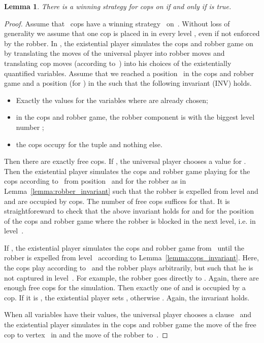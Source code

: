 \documentclass[authoryear]{article}
\makeatletter
\newtheorem{lemma}[theorem]{Lemma}
\theoremstyle{definition}
\newcommand{\0}{\emptyset}
\newcommand{\ie}{i.e.\@\xspace}
\makeatother
\begin{document}
\begin{lemma}
  There is a winning strategy for  cops on  if and only if
   is true.
\end{lemma}
\begin{proof}
  Assume that~ cops have a winning strategy~ on~. Without
  loss of generality we assume that one cop is placed in  in every
  level , even if not enforced by the robber. In , the
  existential player simulates the cops and robber game on  by
  translating the moves of the universal player into robber moves and
  translating cop moves (according to~) into his choices of the
  existentially quantified variables. Assume that we reached a position~ in
  the cops and robber game and a position  (for ) in the
   such that the following invariant (INV) holds.
\begin{itemize}
 \item Exactly the values  for the variables  where 
 are already chosen;

\item in the cops and robber game, the robber component is  with
  the biggest level number ;

\item the cops occupy  for the tuple  and nothing else. 
\end{itemize}
Then there are exactly  free cops. If , the
universal player chooses a value  for . Then
the existential player simulates the cops and robber game playing for
the cops according to~ from position~ and for the robber as in
Lemma~\ref{lemma:robber_invariant} such that the robber is expelled
from level  and  and  are occupied by cops. The number of
free cops suffices for that. It is straightforeward to check that the
above invariant holds for  and for the position of the cops and
robber game where the robber is blocked in the next level, \ie in level~.

If , the existential player simulates the cops and robber 
game from~ until the robber is expelled from level~ according to 
Lemma~\ref{lemma:cops_invariant}. Here, the cops play according
to~ and the robber plays arbitrarily, but such that he is not
captured in level~. For example, the robber goes directly to
. Again, there are enough free cops for 
the simulation. Then exactly one of  and  is  occupied
by a cop. If it is , the existential player sets , 
otherwise . Again, the invariant holds.

When all variables have their values, the universal player chooses a
clause~ and the existential player simulates in the cops and robber
game the move of the free cop to vertex~ in  and the move
of the robber to~. 


\end{proof}
\end{document}
